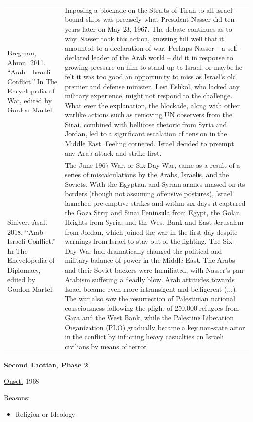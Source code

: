 {\begin{longtable}{p{}p{}}
Bregman, Ahron. 2011. “Arab—Israeli Conflict.” In The Encyclopedia of War, edited by Gordon Martel. & Imposing a blockade on the Straits of Tiran to all Israel-bound ships was precisely what President Nasser did ten years later on May 23, 1967. The debate continues as to why Nasser took this action, knowing full well that it amounted to a declaration of war. Perhaps Nasser – a self-declared leader of the Arab world – did it in response to growing pressure on him to stand up to Israel, or maybe he felt it was too good an opportunity to miss as Israel's old premier and defense minister, Levi Eshkol, who lacked any military experience, might not respond to the challenge. What ever the explanation, the blockade, along with other warlike actions such as removing UN observers from the Sinai, combined with bellicose rhetoric from Syria and Jordan, led to a significant escalation of tension in the Middle East. Feeling cornered, Israel decided to preempt any Arab attack and strike first.
\\
Siniver, Asaf. 2018. “Arab–Israeli Conflict.” In The Encyclopedia of Diplomacy, edited by Gordon Martel. & The June 1967 War, or Six-Day War, came as a result of a series of miscalculations by the Arabs, Israelis, and the Soviets. With the Egyptian and Syrian armies massed on its borders (though not assuming offensive postures), Israel launched pre-emptive strikes and within six days it captured the Gaza Strip and Sinai Peninsula from Egypt, the Golan Heights from Syria, and the West Bank and East Jerusalem from Jordan, which joined the war in the first day despite warnings from Israel to stay out of the fighting. The Six-Day War had dramatically changed the political and military balance of power in the Middle East. The Arabs and their Soviet backers were humiliated, with Nasser's pan-Arabism suffering a deadly blow. Arab attitudes towards Israel became even more intransigent and belligerent (...). The war also saw the resurrection of Palestinian national consciousness following the plight of 250,000 refugees from Gaza and the West Bank, while the Palestine Liberation Organization (PLO) gradually became a key non-state actor in the conflict by inflicting heavy casualties on Israeli civilians by means of terror.
\\
\end{longtable}}
\clearpage
         \textbf{Second Laotian, Phase 2} 

          \underline{Onset:} 1968         

\underline{Reasons:}
\begin{itemize}
\item Religion or Ideology
\end{itemize}

